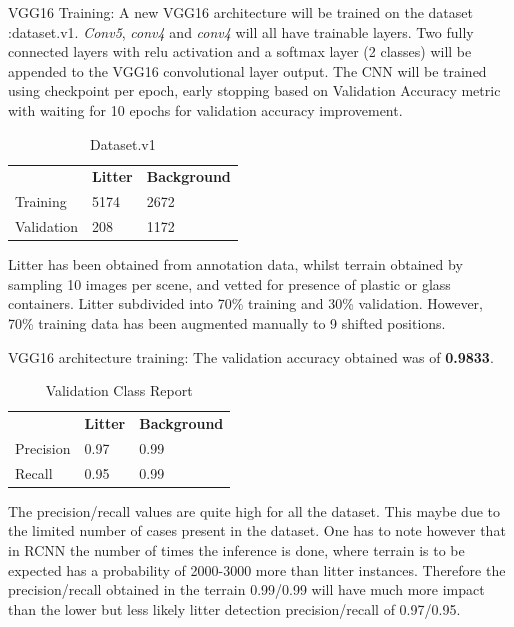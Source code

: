 \documentclass{article}
\begin{document}
VGG16 Training: A new VGG16 architecture will be trained on the dataset :dataset.v1. \textit{Conv5}, \textit{conv4} and \textit{conv4} will all have trainable layers. Two fully connected layers with relu activation and a softmax layer (2 classes) will be appended to the VGG16 convolutional layer output.
The CNN will be trained using checkpoint per epoch, early stopping based on Validation Accuracy metric with waiting for 10 epochs for validation accuracy improvement. 

\begin{table}[h]
\centering
\caption{Dataset.v1}
\begin{tabular}{lll}
\textbf{}  & \textbf{Litter} & \textbf{Background} \\
Training   & 5174            & 2672                \\
Validation & 208             & 1172               
\end{tabular}
\end{table}

Litter has been obtained from annotation data, whilst terrain obtained by sampling 10 images per scene, and vetted for presence of plastic or glass containers. Litter subdivided into 70\% training and 30\%  validation. However, 70\% training data has been augmented manually to 9 shifted positions.\newline

VGG16 architecture training: The validation accuracy obtained was of \textbf{0.9833}. \newline

\begin{table}[h]
\centering
\caption{Validation Class Report}
\begin{tabular}{lll}
\textbf{} & \textbf{Litter} & \textbf{Background} \\
Precision & 0.97            & 0.99                \\
Recall    & 0.95            & 0.99               
\end{tabular}
\end{table}

The precision/recall values are quite high for all the dataset. This maybe due to the limited number of cases present in the dataset. One has to note however that in RCNN the number of times the inference is done, where terrain is to be expected has a probability of 2000-3000 more than litter instances. Therefore the precision/recall obtained in the terrain 0.99/0.99 will have much more impact than the lower but less likely litter detection precision/recall  of 0.97/0.95.\newline
\end{document}
